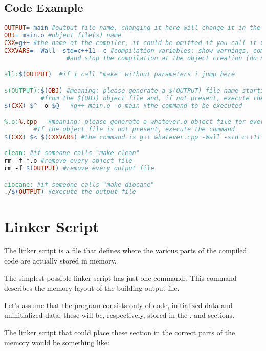 \subsection{Code Example}

\begin{lstlisting}[language=make, basicstyle=\ttfamily \scriptsize]
OUTPUT= main #output file name, changing it here will change it in the whole file
OBJ= main.o #object file(s) name 
CXX=g++	#the name of the compiler, it could be omitted if you call it CXX: its a standard variable
CXXVARS= -Wall -std=c++11 -c #compilation variables: show warnings, compile with c++11 
			     #and stop the compilation at the object creation (do not link the file)

all:$(OUTPUT)  #if i call "make" without parameters i jump here

$(OUTPUT):$(OBJ) #meaning: please generate a $(OUTPUT) file name starting 
		  #from the $(OBJ) object file and, if not present, execute the command
$(CXX) $^ -o $@   #g++ main.o -o main #the command to be executed

%.o:%.cpp	#meaning: please generate a whatever.o object file for every whatever.cpp file. 
		#If the object file is not present, execute the command
$(CXX) $< $(CXXVARS) #the command is g++ whatever.cpp -Wall -std=c++11 -c

clean: #if someone calls "make clean"
rm -f *.o #remove every object file
rm -f $(OUTPUT) #remove every output file

diocane: #if someone calls "make diocane"
./$(OUTPUT) #execute the output file


\end{lstlisting}



\section{Linker Script}
The linker script is a file that defines where the various parts of the compiled code are actually stored in memory.

The simplest possible linker script has just one command:\code[SECTIONS]. This command describes the memory layout of the building output file.

Let's assume that the program consists only of code, initialized data and uninitialized data: these will be, respectively, stored in the ,  and  sections.

The linker script that could place these section in the correct parts of the memory would be something like:

